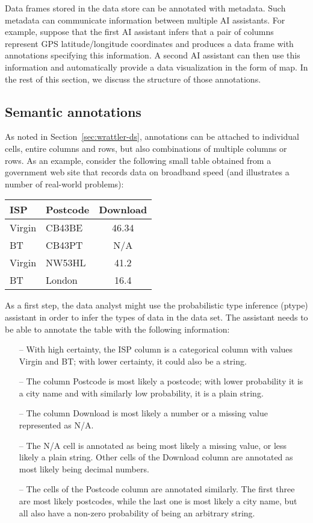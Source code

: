 \documentclass[sigplan,preprint,10pt]{acmart}\settopmatter{printfolios=true,printccs=false,printacmref=false}
\begin{document}
{Data frames stored in the data store can be annotated with
metadata. Such metadata can communicate information between multiple
AI assistants. For example, suppose that the first AI assistant  infers that a pair
of columns represent GPS latitude/longitude coordinates and produces a data frame
with annotations specifying this information. A second AI assistant
can then use this information and automatically provide a data
visualization in the form of map. In the rest of this section, we
discuss the structure of those annotations.

\subsection{Semantic annotations}
As noted in Section~\ref{sec:wrattler-ds}, annotations can be attached to individual cells,
entire columns and rows, but also combinations of multiple columns or rows. As an example,
consider the following small table obtained from a government web site that records data 
on broadband speed (and illustrates a number of real-world problems):

\vspace{1em}
\begin{tabular}{llc}
\toprule
\textbf{ISP}\qquad\qquad\qquad & \textbf{Postcode}\qquad\qquad & \textbf{Download} \\
\midrule
Virgin & CB43BE & 46.34 \\
BT & CB43PT & N/A \\
Virgin & NW53HL & 41.2 \\
BT & London & 16.4 \\
\bottomrule
\end{tabular}
\vspace{1em}

\noindent
As a first step, the data analyst might use the probabilistic type inference (ptype) assistant
in order to infer the types of data in the data set. The assistant needs to be able to annotate
the table with the following information:
%
\begin{itemize}
\item[--] With high certainty, the ISP column is a categorical column with values Virgin and BT;
  with lower certainty, it could also be a string.
\item[--] The column Postcode is most likely a postcode; with lower probability it is a city name
  and with similarly low probability, it is a plain string.
\item[--] The column Download is most likely a number or a missing value represented as N/A.  
\item[--] The N/A cell is annotated as being most likely a missing value, or less likely a plain 
  string. Other cells of the Download column are annotated as most likely being decimal numbers.
\item[--] The cells of the Postcode column are annotated similarly. The first three are most
  likely postcodes, while the last one is most likely a city name, but all also have a non-zero
  probability of being an arbitrary string.
\end{itemize}

}
\end{document}
